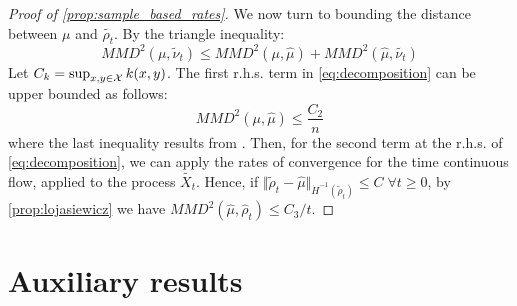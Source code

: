 \begin{proof}[Proof of \cref{prop:sample_based_rates}]
	
	We now turn to bounding the distance between $\mu$ and $\widetilde{\rho_t}$. By the triangle inequality:
	\begin{equation}\label{eq:decomposition}
	MMD^2(\mu, \widetilde{\nu}_t)\le MMD^2(\mu, \widehat{\mu})+MMD^2(\widehat{\mu}, \widetilde{\nu_t})%
	\end{equation}
	Let $C_k=\sup_{x,y \in {{\mathcal X}}}k(x,y)$. The first r.h.s. term in \eqref{eq:decomposition} can be upper bounded as follows:
	\begin{equation}
	MMD^2( \mu,\widehat{\mu})\le \frac{C_2}{n}
	\end{equation}
	where the last inequality results from \cite{tolstikhin2017minimax}.
	Then, for the second term at the r.h.s. of  \eqref{eq:decomposition}, we can apply the rates of convergence for the time continuous flow, applied to the process $\widetilde{X_t}$. Hence, if $\Vert \widetilde{\rho}_t  - \widehat{\mu} \Vert_{\dot{H}^{-1}(\widetilde{\rho}_t)} \leq C \; \forall t\geq 0$, by \cref{prop:lojasiewicz} we have $MMD^2(\widehat{ \mu},\widehat{\rho}_t)\le C_3/t$. 
\end{proof}









\section{Auxiliary results}



